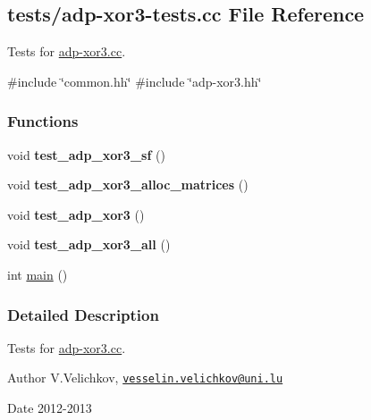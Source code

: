 \hypertarget{adp-xor3-tests_8cc}{\subsection{tests/adp-\/xor3-\/tests.cc \-File \-Reference}
\label{adp-xor3-tests_8cc}
}


\-Tests for \hyperlink{adp-xor3_8cc}{adp-\/xor3.\-cc}.  


{\ttfamily \#include \char`\"{}common.\-hh\char`\"{}}\*
{\ttfamily \#include \char`\"{}adp-\/xor3.\-hh\char`\"{}}\*
\subsubsection*{\-Functions}
\begin{DoxyCompactItemize}
\item 
\hypertarget{adp-xor3-tests_8cc_a522b04e6578f15d9ff7a8c90b6901ed9}{void {\bfseries test\-\_\-adp\-\_\-xor3\-\_\-sf} ()}\label{adp-xor3-tests_8cc_a522b04e6578f15d9ff7a8c90b6901ed9}

\item 
\hypertarget{adp-xor3-tests_8cc_a829f9a4e278ebc3d1a94e88911f9370c}{void {\bfseries test\-\_\-adp\-\_\-xor3\-\_\-alloc\-\_\-matrices} ()}\label{adp-xor3-tests_8cc_a829f9a4e278ebc3d1a94e88911f9370c}

\item 
\hypertarget{adp-xor3-tests_8cc_a040b2ab68f8d685382920ec5bf505ff7}{void {\bfseries test\-\_\-adp\-\_\-xor3} ()}\label{adp-xor3-tests_8cc_a040b2ab68f8d685382920ec5bf505ff7}

\item 
\hypertarget{adp-xor3-tests_8cc_a3309ff54dac432a29d847ce4c1911861}{void {\bfseries test\-\_\-adp\-\_\-xor3\-\_\-all} ()}\label{adp-xor3-tests_8cc_a3309ff54dac432a29d847ce4c1911861}

\item 
int \hyperlink{adp-xor3-tests_8cc_ae66f6b31b5ad750f1fe042a706a4e3d4}{main} ()
\end{DoxyCompactItemize}


\subsubsection{\-Detailed \-Description}
\-Tests for \hyperlink{adp-xor3_8cc}{adp-\/xor3.\-cc}. \begin{DoxyAuthor}{\-Author}
\-V.\-Velichkov, \href{mailto:vesselin.velichkov@uni.lu}{\tt vesselin.\-velichkov@uni.\-lu} 
\end{DoxyAuthor}
\begin{DoxyDate}{\-Date}
2012-\/2013 
\end{DoxyDate}


